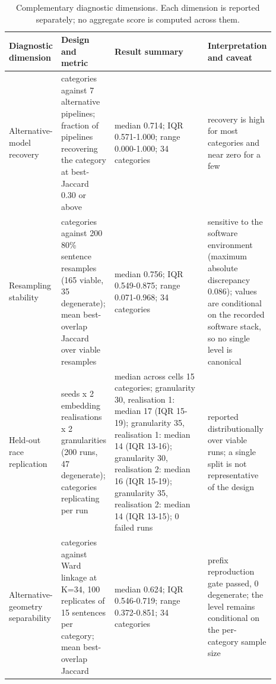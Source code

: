 \begin{table}[H]
\centering\rmfamily\footnotesize
\caption{Complementary diagnostic dimensions. Each dimension is reported separately; no aggregate score is computed across them.}
\label{tab:diagnostics}
\setlength{\tabcolsep}{5pt}
\begin{tabular}{>{\raggedright\arraybackslash}p{0.066\linewidth}>{\raggedright\arraybackslash}p{0.187\linewidth}>{\raggedright\arraybackslash}p{0.396\linewidth}>{\raggedright\arraybackslash}p{0.243\linewidth}}
\toprule
Diagnostic dimension & Design and metric & Result summary & Interpretation and caveat \\
\midrule
Alternative-model recovery & 34 categories against 7 alternative pipelines; fraction of pipelines recovering the category at best-Jaccard 0.30 or above & median 0.714; IQR 0.571-1.000; range 0.000-1.000; 34 categories & recovery is high for most categories and near zero for a few \\
Resampling stability & 34 categories against 200 80\% sentence resamples (165 viable, 35 degenerate); mean best-overlap Jaccard over viable resamples & median 0.756; IQR 0.549-0.875; range 0.071-0.968; 34 categories & sensitive to the software environment (maximum absolute discrepancy 0.086); values are conditional on the recorded software stack, so no single level is canonical \\
Held-out race replication & 50 seeds x 2 embedding realisations x 2 granularities (200 runs, 47 degenerate); categories replicating per run & median across cells 15 categories; granularity 30, realisation 1: median 17 (IQR 15-19); granularity 35, realisation 1: median 14 (IQR 13-16); granularity 30, realisation 2: median 16 (IQR 15-19); granularity 35, realisation 2: median 14 (IQR 13-15); 0 failed runs & reported distributionally over viable runs; a single split is not representative of the design \\
Alternative-geometry separability & 34 categories against Ward linkage at K=34, 100 replicates of 15 sentences per category; mean best-overlap Jaccard & median 0.624; IQR 0.546-0.719; range 0.372-0.851; 34 categories & prefix reproduction gate passed, 0 degenerate; the level remains conditional on the per-category sample size \\
\bottomrule
\end{tabular}
\end{table}
